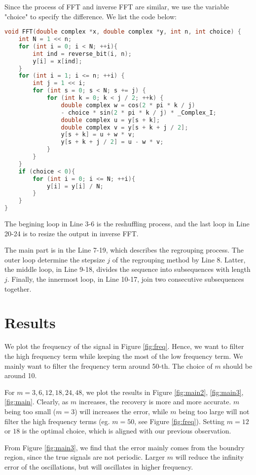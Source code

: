 \documentclass[conference,onecolumn,12pt]{IEEEtran}
\theoremstyle{definition}
\begin{document}
Since the process of FFT and inverse FFT are similar, we use the variable "choice" to specify the difference. We list the code below:
\begin{lstlisting}[language=C]
void FFT(double complex *x, double complex *y, int n, int choice) {
    int N = 1 << n;
    for (int i = 0; i < N; ++i){
        int ind = reverse_bit(i, n);
        y[i] = x[ind];
    }
    for (int i = 1; i <= n; ++i) {
        int j = 1 << i;
        for (int s = 0; s < N; s += j) {
            for (int k = 0; k < j / 2; ++k) {
                double complex w = cos(2 * pi * k / j) 
                - choice * sin(2 * pi * k / j) * _Complex_I;
                double complex u = y[s + k];
                double complex v = y[s + k + j / 2];
                y[s + k] = u + w * v;
                y[s + k + j / 2] = u - w * v;
            }
        }
    }
    if (choice < 0){
        for (int i = 0; i <= N; ++i){
            y[i] = y[i] / N;
        }
    }
}
\end{lstlisting}

The begining loop in Line 3-6 is the reshuffling process, and the last loop in Line 20-24 is to resize the output in inverse FFT.\par
The main part is in the Line 7-19, which describes the regrouping process. The outer loop determine the stepsize $j$ of the regrouping method by Line 8. Latter, the middle loop, in Line 9-18, divides the sequence into subsequences with length $j$. Finally, the innermost loop, in Line 10-17, join two consecutive subsequences together.


\section{Results}
We plot the frequency of the signal in Figure \ref{fig:freq}. Hence, we want to filter the high frequency term while keeping the most of the low frequency term. We mainly want to filter the frequency term around 50-th. The choice of $m$ should be around 10. 

For $m=3,6,12,18,24,48$, we plot the results in Figure \ref{fig:main2}, \ref{fig:main3}, \ref{fig:main}. Clearly, as $m$ increases, the recovery is more and more accurate. $m$ being too small ($m=3$) will increases the error, while $m$ being too large will not filter the high frequency terms (eg. $m=50$, see Figure \ref{fig:freq}). Setting $m=12$ or $18$ is the optimal choice, which is aligned with our previous observation. 

From Figure \ref{fig:main3}, we find that the error mainly comes from the boundry region, since the true signals are not periodic. Larger $m$ will reduce the infinity error of the oscillations, but will oscillates in higher frequency.
\end{document}
